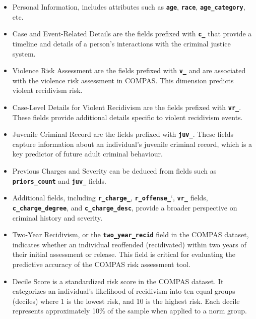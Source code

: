 \documentclass[conference]{IEEEtran}
\begin{document}
	\begin{itemize}
	
		\item Personal Information, includes attributes such as \textbf{\texttt{age}}, \textbf{\texttt{race}}, \textbf{\texttt{age\_category}}, etc.
		
		\item Case and Event-Related Details are the fields prefixed with \textbf{\texttt{c\_}} that provide a timeline and details of a person's interactions with the criminal justice system.
	
		\item Violence Risk Assessment are the fields prefixed with \textbf{\texttt{v\_}} and are associated with the violence risk assessment in COMPAS. This dimension predicts violent recidivism risk.
	
		\item Case-Level Details for Violent Recidivism are the fields prefixed with \textbf{\texttt{vr\_}}. These fields provide additional details specific to violent recidivism events.
	
		\item Juvenile Criminal Record are the fields prefixed with \textbf{\texttt{juv\_}}. These fields capture information about an individual's juvenile criminal record, which is a key predictor of future adult criminal behaviour.
	
		\item Previous Charges and Severity can be deduced from fields such as \textbf{\texttt{priors\_count}} and \textbf{\texttt{juv\_}} fields.
	
		\item Additional fields, including \textbf{\texttt{r\_charge\_}}, \textbf{\texttt{r\_offense\_}}`, \textbf{\texttt{vr\_}} fields, \textbf{\texttt{c\_charge\_degree}}, and \textbf{\texttt{c\_charge\_desc}}, provide a broader perspective on criminal history and severity.
	
	
		\item Two-Year Recidivism,  or the \textbf{\texttt{two\_year\_recid}} field in the COMPAS dataset, indicates whether an individual reoffended (recidivated) within two years of their initial assessment or release. This field is critical for evaluating the predictive accuracy of the COMPAS risk assessment tool.
	
		\item Decile Score is a standardized risk score in the COMPAS dataset. It categorizes an individual's likelihood of recidivism into ten equal groups (deciles) where 1 is the lowest risk, and 10 is the highest risk. Each decile represents approximately 10\% of the sample when applied to a norm group.
	

	\end{itemize}
\end{document}
